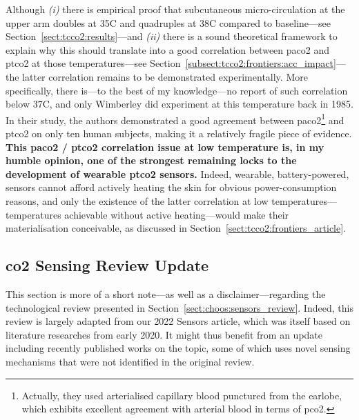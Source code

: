 Although \textit{(i)} there is empirical proof that subcutaneous micro-circulation at the upper arm doubles at 35{\degree}C and quadruples at 38{\degree}C compared to baseline---see Section~\ref{sect:tcco2:results}---and \textit{(ii)} there is a sound theoretical framework to explain why this should translate into a good correlation between \gls{paco2} and \gls{ptco2} at those temperatures---see Section~\ref{subsect:tcco2:frontiers:acc_impact}---the latter correlation remains to be demonstrated experimentally. More specifically, there is---to the best of my knowledge---no report of such correlation below 37{\degree}C, and only Wimberley \etal{} did experiment at this temperature back in 1985\cite{wimberley1985a}. In their study, the authors demonstrated a good agreement between \gls{paco2}\footnote{Actually, they used arterialised capillary blood punctured from the earlobe, which exhibits excellent agreement with arterial blood in terms of \gls{pco2}\cite{zavorsky2007}.} and \gls{ptco2} on only ten human subjects, making it a relatively fragile piece of evidence. \textbf{This \gls{paco2} / \gls{ptco2} correlation issue at low temperature is, in my humble opinion, one of the strongest remaining locks to the development of wearable \gls{ptco2} sensors.} Indeed, wearable, battery-powered, sensors cannot afford actively heating the skin for obvious power-consumption reasons, and only the existence of the latter correlation at low temperatures---\ie{} temperatures achievable without active heating---would make their materialisation conceivable, as discussed in Section~\ref{sect:tcco2:frontiers_article}.

\subsection{\texorpdfstring{\gls{co2}}{CO2} Sensing Review Update}

This section is more of a short note---as well as a disclaimer---regarding the technological review presented in Section~\ref{sect:choos:sensors_review}. Indeed, this review is largely adapted from our 2022 Sensors article\cite{dervieux2022}, which was itself based on literature researches from early 2020. It might thus benefit from an update including recently published works on the topic, some of which uses novel sensing mechanisms that were not identified in the original review.

